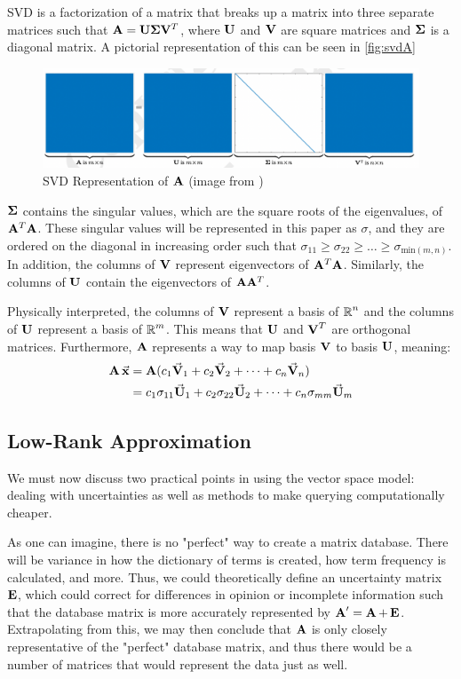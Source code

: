 SVD is a factorization of a matrix that breaks up a matrix into three separate matrices such that $\mathbf{A} = \mathbf{U}\mathbf{\Sigma}\mathbf{V}^T$, 
where $\mathbf{U}$ and $\mathbf{V}$ are square matrices and $\mathbf{\Sigma}$ is a diagonal matrix. A pictorial representation of this can be seen in \autoref{fig:svdA}
\begin{figure}[H]
    \centering
    \includegraphics[width=\textwidth]{./imgs/SVD.jpg}
    \caption{SVD Representation of $\operatorname{\mathbf{A}}$ (image from \cite{svdImage})}
    \label{fig:svdA}
\end{figure}
 $\operatorname{\mathbf{\Sigma}}$ contains the singular values, which are the square roots of the eigenvalues, of $\mathbf{A}^T\mathbf{A}$. 
 These singular values will be represented in this paper as $\sigma$, and they are ordered on the diagonal in increasing 
 order such that $\sigma_{11} \geq \sigma_{22} \geq \dots \geq \sigma_{\text{min}(m,n)}$. In addition, the columns of $\operatorname{\mathbf{V}}$ 
 represent eigenvectors of $\mathbf{A}^T\mathbf{A}$. Similarly, the columns of $\operatorname{\mathbf{U}}$ contain the eigenvectors of $\mathbf{A}\mathbf{A}^T$. 

  
 Physically interpreted, the columns of $\mathbf{V}$ represent a basis of $\operatorname{\mathbb{R}}^n$ and the columns of $\mathbf{U}$ represent a basis of $\operatorname{\mathbb{R}}^m$. This means that $\operatorname{\mathbf{U}}$ and $\operatorname{\mathbf{V}}^T$ are orthogonal matrices. Furthermore, $\operatorname{\mathbf{A}}$ represents a way to map basis $\operatorname{\mathbf{V}}$ to basis $\operatorname{\mathbf{U}}$, meaning:
 \begin{align*}
     \operatorname{\mathbf{A}}\vec{\mathbf{x}} &= \operatorname{\mathbf{A}}( c_1\vec{\mathbf{V}}_1 + c_2\vec{\mathbf{V}}_2 + \dots + c_n\vec{\mathbf{V}}_n)\\
     &= c_1\sigma_{11}\vec{\mathbf{U}}_1 +  c_2\sigma_{22}\vec{\mathbf{U}}_2 + \dots + c_n\sigma_{mm}\vec{\mathbf{U}}_m 
 \end{align*}


\subsection{Low-Rank Approximation}\label{subsec:lowRankAppx}
We must now discuss two practical points in using the vector space model: dealing with uncertainties as well as methods to
make querying computationally cheaper.

As one can imagine, there is no "perfect" way to create a matrix database. There will be variance in how the 
dictionary of terms is created, how term frequency is calculated, and more. Thus, we could theoretically define an uncertainty 
matrix $\operatorname{\mathbf{E}}$, which could correct for differences in opinion or incomplete information such that the database matrix 
is more accurately represented by $\operatorname{\mathbf{A}}'=\operatorname{\mathbf{A}} + \operatorname{\mathbf{E}}$. Extrapolating from this, we may then conclude that $\operatorname{\mathbf{A}}$ is only closely representative
of the "perfect" database matrix, and thus there would be a number of matrices that would represent the data just as well.

